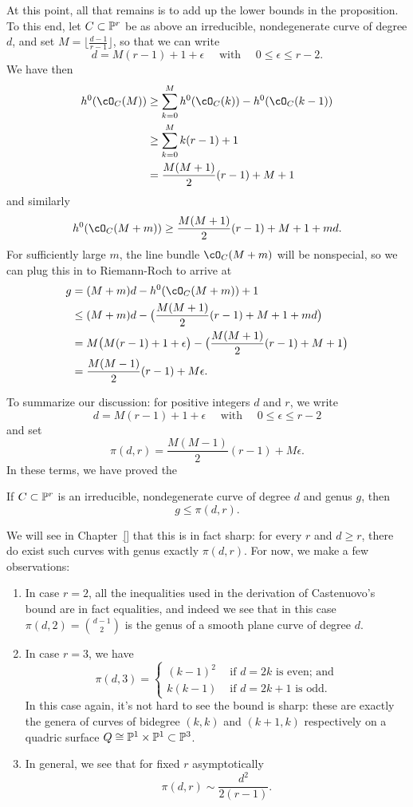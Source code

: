 At this point, all that remains is to add up the lower bounds in the proposition. To this end, let $C \subset \PP^r$ be as above an irreducible, nondegenerate curve of degree $d$, and set $M = \lfloor{\frac{d-1}{r-1}}\rfloor$, so that we can write
$$
d = M(r-1) + 1 + \epsilon \quad \text{ with } \quad 0 \leq \epsilon \leq r-2.
$$
We have then
\begin{align*}
h^0(\cO_C(M)) &\geq \sum_{k=0}^M h^0(\cO_C(k)) - h^0(\cO_C(k-1)) \\
&\geq  \sum_{k=0}^M k(r-1)+1 \\
&= \frac{M(M+1)}{2}(r-1) + M + 1
\end{align*}
and similarly
$$
h^0(\cO_C(M+m)) \geq \frac{M(M+1)}{2}(r-1) + M + 1 + md.
$$
For sufficiently large $m$, the line bundle $\cO_C(M+m)$ will be nonspecial, so we can plug this in to Riemann-Roch to arrive at
\begin{align*}
g &= (M+m)d - h^0(\cO_C(M+m)) + 1 \\
&\leq (M+m)d - \bigl(  \frac{M(M+1)}{2}(r-1) + M + 1 + md \bigr) \\
& = M\bigl( M(r-1) + 1 + \epsilon \bigr) - \bigl(  \frac{M(M+1)}{2}(r-1) + M + 1 \bigr) \\
&= \frac{M(M-1)}{2}(r-1) + M\epsilon.
\end{align*}

To summarize our discussion: for positive integers $d$ and $r$, we write
$$
 d = M(r-1) + 1 + \epsilon \quad \text{ with } \quad 0 \leq \epsilon \leq r-2
$$
and set
$$
\pi(d,r) = \frac{M(M-1)}{2}(r-1) + M\epsilon.
$$
In these terms, we have proved the

\begin{theorem}
If $C \subset \PP^r$ is an irreducible, nondegenerate curve of degree $d$ and genus $g$, then
$$
g \leq \pi(d,r).
$$
\end{theorem}

We will see in Chapter~\ref{} that this is in fact sharp: for every $r$ and $d \geq r$, there do exist such curves with genus exactly $\pi(d,r)$. For now, we make a few observations:

\begin{enumerate}
\item In case $r=2$, all the inequalities used in the derivation of Castenuovo's bound are in fact equalities, and indeed we see that in this case $\pi(d,2) = \binom{d-1}{2}$ is the genus of a smooth plane curve of degree $d$.

\item In case $r=3$, we have
$$
\pi(d,3) =
\begin{cases}
\left( k - 1 \right)^2 &\text{ if $d=2k$ is even; and} \\
k(k-1) &\text{ if $d=2k+1$ is odd.}
\end{cases}
$$
In this case again, it's not hard to see the bound is sharp: these are exactly the genera of curves of bidegree $(k,k)$ and $(k+1,k)$ respectively on a quadric surface $Q \cong \PP^1 \times \PP^1 \subset \PP^3$.
\item In general, we see that for fixed $r$ asymptotically
$$
\pi(d,r) \sim \frac{d^2}{2(r-1)}.
$$
\end{enumerate}


